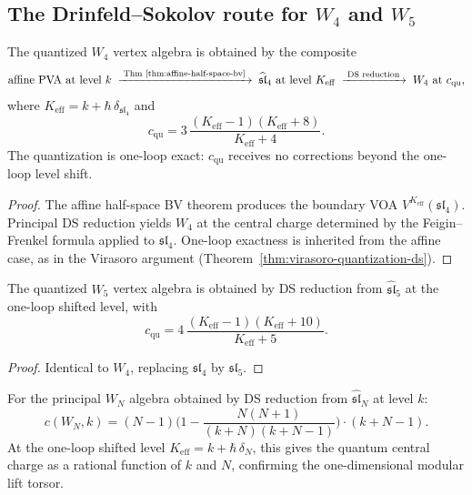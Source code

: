 \subsection{The Drinfeld--Sokolov route for $W_4$ and $W_5$}

\begin{theorem}
The quantized $W_4$ vertex algebra is obtained by the composite
\[
\text{affine PVA at level }k
\;\xrightarrow{\;\text{Thm~\ref{thm:affine-half-space-bv}}\;}
\;\widehat{\mathfrak{sl}}_4\text{ at level }K_{\mathrm{eff}}
\;\xrightarrow{\;\text{DS reduction}\;}
\;W_4\text{ at }c_{\mathrm{qu}},
\]
where $K_{\mathrm{eff}} = k + \hbar\,\delta_{\mathfrak{sl}_4}$ and
\[
c_{\mathrm{qu}}
=
3\,\frac{(K_{\mathrm{eff}}-1)(K_{\mathrm{eff}}+8)}{K_{\mathrm{eff}}+4}.
\]
The quantization is one-loop exact: $c_{\mathrm{qu}}$ receives no
corrections beyond the one-loop level shift.
\end{theorem}

\begin{proof}
The affine half-space BV theorem produces the boundary VOA
$V^{K_{\mathrm{eff}}}(\mathfrak{sl}_4)$. Principal DS reduction
yields $W_4$ at the central charge determined by the Feigin--Frenkel
formula applied to $\mathfrak{sl}_4$. One-loop exactness is inherited
from the affine case, as in the Virasoro argument
(Theorem~\ref{thm:virasoro-quantization-ds}).
\end{proof}

\begin{theorem}
The quantized $W_5$ vertex algebra is obtained by DS reduction from
$\widehat{\mathfrak{sl}}_5$ at the one-loop shifted level, with
\[
c_{\mathrm{qu}}
=
4\,\frac{(K_{\mathrm{eff}}-1)(K_{\mathrm{eff}}+10)}{K_{\mathrm{eff}}+5}.
\]
\end{theorem}

\begin{proof}
Identical to $W_4$, replacing $\mathfrak{sl}_4$ by $\mathfrak{sl}_5$.
\end{proof}

\begin{proposition}
For the principal $W_N$ algebra obtained by DS reduction from
$\widehat{\mathfrak{sl}}_N$ at level $k$:
\begin{equation}%
c(W_N, k)
=
(N-1)\biggl(1 - \frac{N(N+1)}{(k+N)(k+N-1)}\biggr)
\cdot (k+N-1).
\end{equation}
At the one-loop shifted level $K_{\mathrm{eff}} = k + \hbar\,\delta_N$,
this gives the quantum central charge as a rational function of $k$
and $N$, confirming the one-dimensional modular lift torsor.
\end{proposition}

